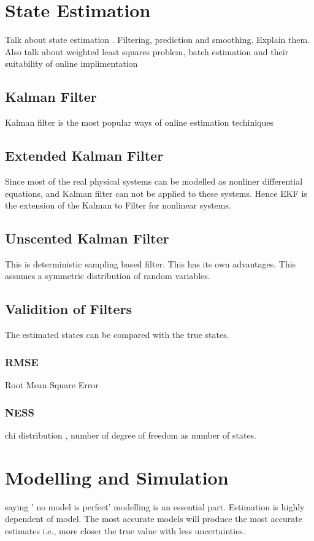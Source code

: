 \chapter{State Estimation}
\label{chpater 3}
Talk about state estimation . Filtering, prediction and smoothing. Explain them. Also talk about weighted least squares problem, batch estimation and their suitability of online implimentation
\section{Kalman Filter}
Kalman filter is the most popular ways of online estimation techiniques

\section{Extended Kalman Filter}
Since most of the real physical systems can be modelled as nonliner differential equations, and Kalman filter can not be applied to these systems. Hence EKF is the extension of the Kalman to Filter for nonlinear systems.
\section{Unscented Kalman Filter}
This is deterministic sampling based filter. This has its own advantages. 
This assumes a symmetric distribution of random variables. 
\section{Validition of Filters}
The estimated states can be compared with the true states.
\subsection{RMSE}
Root Mean Square Error
\subsection{NESS}
chi distribution , number of degree of freedom as number of states.
\chapter{Modelling and Simulation}
saying ' no model is perfect'
modelling is an essential part. Estimation is highly dependent of model. The most accurate models will produce the most accurate estimates i.e., more closer the true value with less uncertainties.

